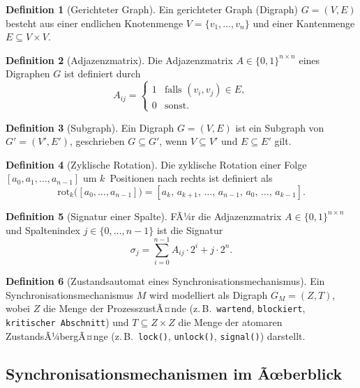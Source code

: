 ﻿\documentclass[a4paper,12pt]{article}
\theoremstyle{definition}
\newtheorem{definition}{Definition}
\begin{document}
\begin{definition}[Gerichteter Graph]
  Ein gerichteter Graph (Digraph) $G = (V, E)$ besteht aus einer endlichen
  Knotenmenge $V = \{v_1, \ldots, v_n\}$ und einer Kantenmenge
  $E \subseteq V \times V$.
\end{definition}

\begin{definition}[Adjazenzmatrix]
  Die Adjazenzmatrix $A \in \{0,1\}^{n \times n}$ eines Digraphen $G$ ist
  definiert durch
  \[
    A_{ij} =
    \begin{cases}
      1 & \text{falls } (v_i, v_j) \in E,\\
      0 & \text{sonst.}
    \end{cases}
  \]
\end{definition}

\begin{definition}[Subgraph]
  \label{def:subgraph}
  Ein Digraph $G = (V, E)$ ist ein Subgraph von $G' = (V', E')$, geschrieben
  $G \subseteq G'$, wenn $V \subseteq V'$ und $E \subseteq E'$ gilt.
\end{definition}

\begin{definition}[Zyklische Rotation]
  Die zyklische Rotation einer Folge $[a_0, a_1, \ldots, a_{n-1}]$ um
  $k$~Positionen nach rechts ist definiert als
  \[
    \mathrm{rot}_k\bigl([a_0, \ldots, a_{n-1}]\bigr)
    = [a_k,\, a_{k+1},\, \ldots,\, a_{n-1},\, a_0,\, \ldots,\, a_{k-1}].
  \]
\end{definition}

\begin{definition}[Signatur einer Spalte]
  \label{def:signatur}
  FÃ¼r die Adjazenzmatrix $A \in \{0,1\}^{n \times n}$ und Spaltenindex
  $j \in \{0, \ldots, n-1\}$ ist die Signatur
  \[
    \sigma_j = \sum_{i=0}^{n-1} A_{ij} \cdot 2^{i} + j \cdot 2^{n}.
  \]
\end{definition}

\begin{definition}[Zustandsautomat eines Synchronisationsmechanismus]
  Ein Synchronisationsmechanismus $M$ wird modelliert als Digraph
  $G_M = (Z, T)$, wobei $Z$ die Menge der ProzesszustÃ¤nde (z.\,B.\
  \texttt{wartend}, \texttt{blockiert}, \texttt{kritischer Abschnitt}) und
  $T \subseteq Z \times Z$ die Menge der atomaren ZustandsÃ¼bergÃ¤nge (z.\,B.\
  \texttt{lock()}, \texttt{unlock()}, \texttt{signal()}) darstellt.
\end{definition}

\subsection{Synchronisationsmechanismen im Ãœberblick}
\end{document}
